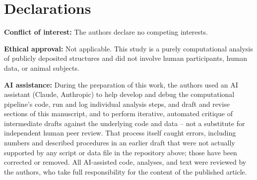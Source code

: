 \documentclass[global,twocolumn]{svjour}
\begin{document}
\section*{Declarations}

\textbf{Conflict of interest:} The authors declare no competing interests.

\textbf{Ethical approval:} Not applicable. This study is a purely
computational analysis of publicly deposited structures and did not involve
human participants, human data, or animal subjects.

\textbf{AI assistance:} During the preparation of this work, the authors
used an AI assistant (Claude, Anthropic) to help develop and debug the
computational pipeline's code, run and log individual analysis steps, and
draft and revise sections of this manuscript, and to perform iterative,
automated critique of intermediate drafts against the underlying code and
data -- not a substitute for independent human peer review. That process
itself caught errors, including numbers and described procedures in an
earlier draft that were not actually supported by any script or data file
in the repository above; those have been corrected or removed. All
AI-assisted code, analyses, and text were reviewed by the authors, who take
full responsibility for the content of the published article.



\end{document}
